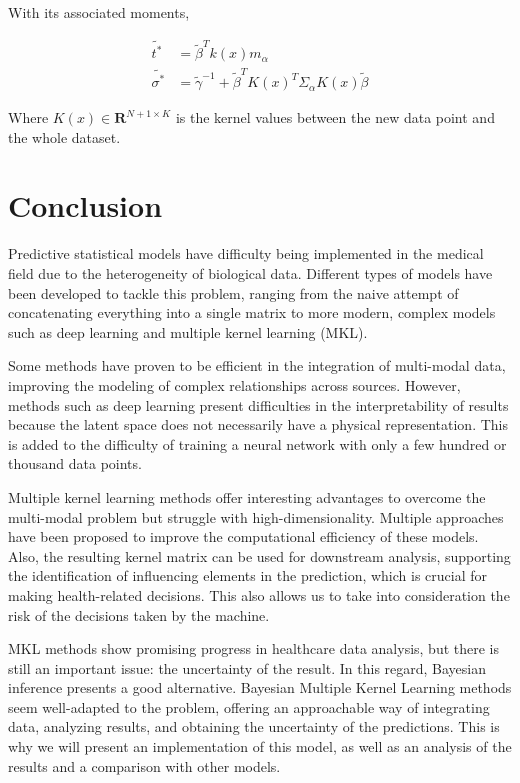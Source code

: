 \documentclass[11pt,a4paper]{article}
\begin{document}
With its associated moments,

\begin{align*}
    \widetilde{t^*} &= \widetilde{\beta}^T k(x) m_{\alpha} \\
    \widetilde{\sigma^*} &= \widetilde{\gamma}^{-1} + \widetilde{\beta}^T K(x)^T \Sigma_{\alpha} K(x) \widetilde{\beta}
\end{align*}

Where $K(x) \in \mathbf{R}^{N+1 \times K}$ is the kernel values between the new data point and the whole dataset. 

\section{Conclusion}

Predictive statistical models have difficulty being implemented in the medical field due to the heterogeneity of biological data. Different types of models have been developed to tackle this problem, ranging from the naive attempt of concatenating everything into a single matrix to more modern, complex models such as deep learning and multiple kernel learning (MKL).

Some methods have proven to be efficient in the integration of multi-modal data, improving the modeling of complex relationships across sources. However, methods such as deep learning present difficulties in the interpretability of results because the latent space does not necessarily have a physical representation. This is added to the difficulty of training a neural network with only a few hundred or thousand data points.

Multiple kernel learning methods offer interesting advantages to overcome the multi-modal problem but struggle with high-dimensionality. Multiple approaches have been proposed to improve the computational efficiency of these models. Also, the resulting kernel matrix can be used for downstream analysis, supporting the identification of influencing elements in the prediction, which is crucial for making health-related decisions. This also allows us to take into consideration the risk of the decisions taken by the machine.

MKL methods show promising progress in healthcare data analysis, but there is still an important issue: the uncertainty of the result. In this regard, Bayesian inference presents a good alternative. Bayesian Multiple Kernel Learning methods seem well-adapted to the problem, offering an approachable way of integrating data, analyzing results, and obtaining the uncertainty of the predictions. This is why we will present an implementation of this model, as well as an analysis of the results and a comparison with other models.





\end{document}

